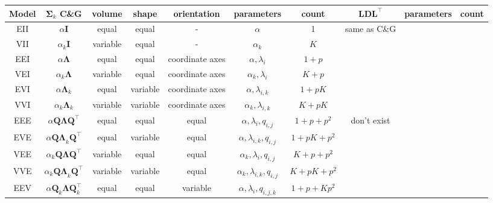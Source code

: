 \begin{table}[!htb]
	\centering
{}
{
	\begin{tabular}{| c | c c c c c c | c c c |}
		\hline
		Model & $\pmb{\Sigma}_k$ C\&G & volume & shape & orientation & parameters & count & $ \pmb{LDL}^\top $ & parameters & count \\
		\hline

		EII	& $ \alpha \pmb{I} $ & equal & equal & - & $ \alpha $ 
				& 1 & same as C\&G
						& & \\

		VII	& $ \alpha_k \pmb{I} $ 		& variable & equal & - & $ \alpha_k $ 
				& $ K $ &
					& & \\

		EEI	& $ \alpha \pmb{\Lambda} $ 	& equal & equal & coordinate axes & $ \alpha, \lambda_i $ 
				& $ 1+p $ &
					& & \\

		VEI	& $ \alpha_k \pmb{\Lambda} $ & variable & equal & coordinate axes & $ \alpha_k, \lambda_{i}$ 
				& $ K+p $ &
					& & \\

		EVI	& $ \alpha \pmb{\Lambda}_k $ &equal & variable & coordinate axes & $ \alpha, \lambda_{i,k} $ 
				& $ 1+pK $ &
					& & \\

		VVI	& $ \alpha_k \pmb{\Lambda}_k $ & variable & variable & coordinate axes & $ \alpha_k, \lambda_{i,k} $ 
				& $ K+pK $ &
					& & \\

		\hline

		EEE	& $ \alpha \pmb{Q \Lambda Q}^\top $ &equal & equal & equal & $ \alpha, \lambda_{i}, q_{i,j} $ 
				& $ 1+p+p^2 $ & don't exist
					& & \\

		EVE	& $ \alpha \pmb{Q \Lambda}_k \pmb{Q}^\top $ &equal & variable & equal & $ \alpha, \lambda_{i,k}, q_{i,j} $ 
				& $ 1+pK+p^2 $ &
					& & \\

		VEE	& $ \alpha_k \pmb{Q \Lambda Q}^\top $ & variable & equal & equal & $ \alpha_k, \lambda_{i}, q_{i,j} $ 
				& $ K+p+p^2 $ &
					& & \\
					
		VVE	& $ \alpha_k \pmb{Q \Lambda}_k \pmb{Q}^\top $ &variable & variable & equal & $ \alpha_k, \lambda_{i,k}, q_{i,j} $ 
				& $ K+pK+p^2 $ &
					& & \\

		EEV	& $ \alpha \pmb{Q}_k \pmb{\Lambda} \pmb{Q}_k^\top $ &equal & equal & variable & $ \alpha, \lambda_{i}, q_{i,j,k} $ 
				& $ 1+p+Kp^2 $ &
					& & \\


\end{tabular}}
\end{table}
